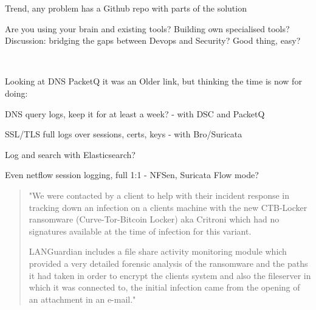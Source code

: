 \documentclass[20pt,landscape,a4paper,footrule]{foils}
\begin{document}

Trend, any problem has a Github repo with parts of the solution \smiley



Are you using your brain and existing tools? Building own specialised tools?\\
Discussion: bridging the gaps between Devops and Security? Good thing, easy?

{\footnotesize
{}\\
}



Looking at DNS PacketQ it was an Older link, but thinking the time is now for doing:

\begin{list2}
\item DNS query logs, keep it for at least a week? - with DSC and PacketQ
\item SSL/TLS full logs over sessions, certs, keys - with Bro/Suricata\\
\item Log and search with Elasticsearch?\\
\item Even netflow session logging, full 1:1 - NFSen, Suricata Flow mode?
\end{list2}



\begin{quote}
"We were contacted by a client to help with their incident response in tracking down an
infection on a clients machine with the new CTB-Locker ransomware (Curve-Tor-Bitcoin Locker)
aka Critroni which had no signatures available at the time of infection for this variant.

LANGuardian includes a file share activity monitoring module which provided a very
detailed forensic analysis of the ransomware and the paths it had taken in order to
encrypt the clients system and also the fileserver in which it was connected to, the
initial infection came from the opening of an attachment in an e-mail."
\end{quote}
\end{document}
